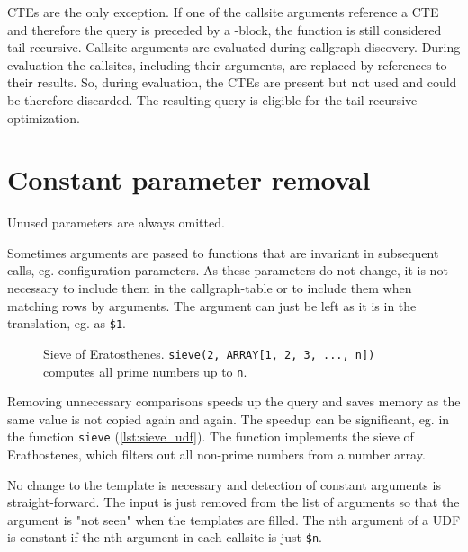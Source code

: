 CTEs are the only exception. If one of the callsite arguments reference a CTE and therefore the query is preceded by a \WITH-block, the function is still considered tail recursive. Callsite-arguments are evaluated during callgraph discovery. During evaluation the callsites, including their arguments, are replaced by references to their results. So, during evaluation, the CTEs are present but not used and could be therefore discarded. The resulting query is eligible for the tail recursive optimization.

\section{Constant parameter removal}

Unused parameters are always omitted.

Sometimes arguments are passed to functions that are invariant in subsequent calls, eg. configuration parameters. As these parameters do not change, it is not necessary to include them in the callgraph-table or to include them when matching rows by arguments. The argument can just be left as it is in the translation, eg. as \texttt{\$1}.

\begin{wrapfigure}{r}{0.66\textwidth}
  \vspace{-10pt}
  \caption{Sieve of Eratosthenes. \texttt{sieve(2, ARRAY[1, 2, 3, ..., n])} computes all prime numbers up to \texttt{n}.}
  \label{lst:sieve_udf}
\end{wrapfigure}

Removing unnecessary comparisons speeds up the query and saves memory as the same value is not copied again and again. The speedup can be significant, eg. in the function \texttt{sieve} (\autoref{lst:sieve_udf}). The function implements the sieve of Erathostenes, which filters out all non-prime numbers from a number array.

No change to the template is necessary and detection of constant arguments is straight-forward. The input is just removed from the list of arguments so that the argument is "not seen" when the templates are filled. The nth argument of a UDF is constant if the nth argument in each callsite is just \texttt{\$n}.

